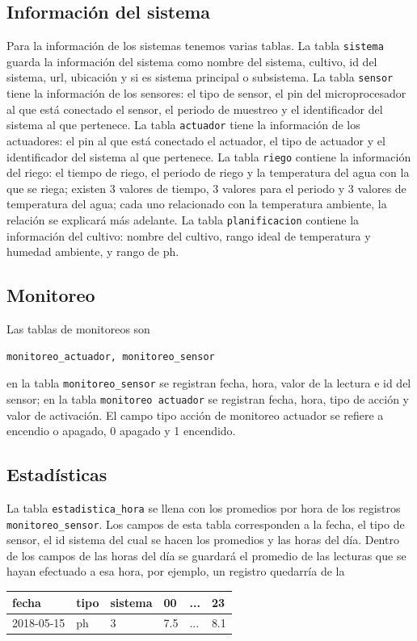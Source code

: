 \documentclass[10pt,twocolumn]{article}
\begin{document}
\subsection{Informaci\'on del sistema} 
Para la informaci\'on de los sistemas tenemos varias tablas. La tabla 
\verb|sistema| guarda la informaci\'on del sistema como nombre del sistema, cultivo, id del 
sistema, url, ubicaci\'on y si es sistema principal o subsistema. La 
tabla \verb|sensor| tiene la informaci\'on de los sensores: el tipo de sensor, 
el pin del microprocesador al que est\'a conectado el sensor, 
el periodo de muestreo y el identificador del sistema al que pertenece. La tabla \verb|actuador| tiene la informaci\'on de los actuadores: el pin al que est\'a conectado el 
actuador, 
el tipo de actuador y el identificador del sistema al que pertenece. La tabla \verb|riego| contiene la informaci\'on del
 riego: el tiempo de riego, el periodo de riego y la temperatura del agua con la que se riega; existen 3 valores de tiempo, 3 valores para el periodo y 3 
valores de temperatura del agua; cada uno relacionado con la temperatura ambiente, la relaci\'on se explicar\'a m\'as adelante. La tabla 
\verb|planificacion| contiene 
la informaci\'on del cultivo: nombre del cultivo, rango ideal de 
temperatura y humedad ambiente, y rango de ph.

\subsection{Monitoreo}
Las tablas de monitoreos son 

\begin{verbatim}
monitoreo_actuador, monitoreo_sensor
\end{verbatim}

en la tabla \verb|monitoreo_sensor| se registran fecha, hora, valor de la lectura e id del sensor; 
en la tabla \verb|monitoreo actuador| se registran fecha, hora, tipo de acci\'on y valor 
de activaci\'on. El campo tipo acci\'on de monitoreo actuador se 
refiere a encendio o apagado, 0 apagado y 1 encendido.

\subsection{Estad\'isticas}
La tabla \verb|estadistica_hora| se llena con los promedios por hora de los 
registros \verb|monitoreo_sensor|. Los campos de esta tabla corresponden a la fecha, el tipo de sensor, el id sistema del cual se hacen los promedios y las horas del d\'ia. 
Dentro de los campos de las horas del d\'ia se guardar\'a el promedio de las lecturas que se hayan efectuado a esa hora, por ejemplo, un registro quedarr\'ia de la 
\begin{tabular}[h]{|l|l|l|l|l|l|}
        \hline
        fecha & tipo & sistema & 00 & ... & 23 \\ \hline
        2018-05-15 & ph & 3 & 7.5 & ... & 8.1 \\  \hline
\end{tabular}
\end{document}
